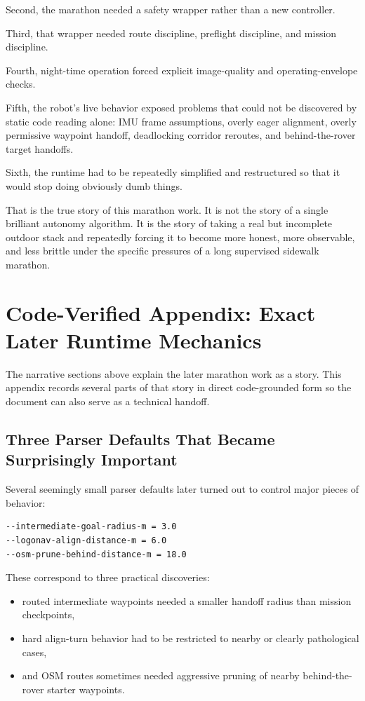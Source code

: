 \documentclass[11pt]{article}
\begin{document}
Second, the marathon needed a safety wrapper rather than a new controller.

Third, that wrapper needed route discipline, preflight discipline, and mission discipline.

Fourth, night-time operation forced explicit image-quality and operating-envelope checks.

Fifth, the robot's live behavior exposed problems that could not be discovered by static code reading alone: IMU frame assumptions, overly eager alignment, overly permissive waypoint handoff, deadlocking corridor reroutes, and behind-the-rover target handoffs.

Sixth, the runtime had to be repeatedly simplified and restructured so that it would stop doing obviously dumb things.

That is the true story of this marathon work. It is not the story of a single brilliant autonomy algorithm. It is the story of taking a real but incomplete outdoor stack and repeatedly forcing it to become more honest, more observable, and less brittle under the specific pressures of a long supervised sidewalk marathon.


\section{Code-Verified Appendix: Exact Later Runtime Mechanics}
The narrative sections above explain the later marathon work as a story. This appendix records several parts of that story in direct code-grounded form so the document can also serve as a technical handoff.

\subsection{Three Parser Defaults That Became Surprisingly Important}
Several seemingly small parser defaults later turned out to control major pieces of behavior:
\begin{verbatim}
--intermediate-goal-radius-m = 3.0
--logonav-align-distance-m = 6.0
--osm-prune-behind-distance-m = 18.0
\end{verbatim}

These correspond to three practical discoveries:
\begin{itemize}[leftmargin=*]
\item routed intermediate waypoints needed a smaller handoff radius than mission checkpoints,
\item hard align-turn behavior had to be restricted to nearby or clearly pathological cases,
\item and OSM routes sometimes needed aggressive pruning of nearby behind-the-rover starter waypoints.
\end{itemize}
\end{document}
